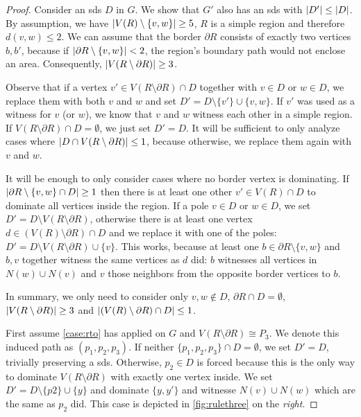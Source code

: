 \begin{proof}
        Consider an sds $D$ in $G$. We show that $G'$ also has an sds with $\abs{D'} \leq \abs{D}$. 
        By assumption, we have $\abs{V(R) \setminus \{v, w\}} \geq 5$, $R$ is a simple region and therefore $d(v,w) \leq 2$.
        We can assume that the border $\partial R$ consists of exactly two vertices $b, b'$, because if $\abs{\partial R \setminus \{v,w\}}  < 2$, the region's boundary path would not enclose an area.
        Consequently, $\abs{V(R \setminus \partial R)} \geq 3$.

        Observe that if a vertex $v' \in V(R \setminus \partial R) \cap D$ together with $v \in D$ or $w\in D$, we replace them with both $v$ and $w$ and set $D' = D \setminus \{v'\} \cup \{v,w\}$.  
        If $v'$ was used as a witness for $v$ (or $w$), we know that $v$ and $w$ witness each other in a simple region. 
        If $V(R \setminus \partial R) \cap D = \emptyset$, we just set $D' = D$. 
        It will be sufficient to only analyze cases where $\abs{D \cap V(R \setminus \partial R)} \leq 1$, because otherwise, we replace them again with $v$ and $w$. 

        It will be enough to only consider cases where no border vertex is dominating. 
        If $\abs{\partial R \setminus \{v,w\} \cap D} \geq 1$ then there is at least one other $v' \in V(R) \cap D$ to dominate all vertices inside the region.
        If a pole $v \in D$ or $w \in D$, we set $D' = D \setminus V(R \setminus \partial R)$, otherwise there is at least one vertex $d \in (V(R) \setminus \partial R) \cap D$ and we replace it with one of the poles: $D' = D \setminus V(R \setminus \partial R) \cup \{v\}$.
        This works, because at least one $b \in \partial R \setminus \{v, w\}$ and $b,v$ together witness the same vertices as $d$ did: $b$ witnesses all vertices in $N(w) \cup N(v)$ and $v$ those neighbors from the opposite border vertices to $b$.

        \vspace*{1em}
        
        In summary, we only need to consider only $v,w \notin D$, $\partial R \cap D = \emptyset$, $\abs{V(R \setminus \partial R)} \geq 3$ and $\abs{(V(R) \setminus \partial R) \cap D} \leq 1$.

        First assume \cref{case:rto} has applied on $G$ and $V(R \setminus \partial R) \cong P_3$. 
        We denote this induced path as $(p_1,p_2,p_3)$.         
         If neither $\{p_1,p_2,p_3\} \cap D = \emptyset$, we set $D' = D$, trivially preserving a sds. 
         Otherwise, $p_2 \in D$ is forced because this is the only way to dominate $V(R \setminus \partial R)$ with exactly one vertex inside. 
         We set $D' = D \setminus \{p2\} \cup \{y\}$ and dominate $\{y,y'\}$ and witnesse $N(v) \cup N(w)$ which are the same as $p_2$ did. 
         This case is depicted in \cref{fig:rulethree} on the \textit{right}.


\end{proof}
